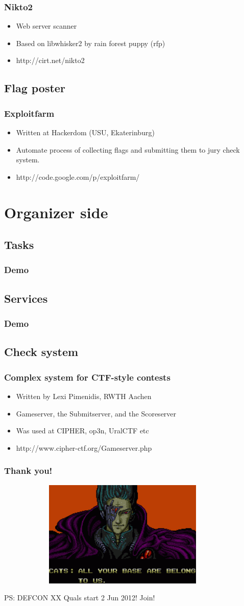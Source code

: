 \documentclass{beamer}
\begin{document}
\frame
{
\frametitle{Nikto2}
\begin{itemize}
\item Web server scanner
\item Based on libwhisker2 by rain forest puppy (rfp)
\item http://cirt.net/nikto2
\end{itemize}
}

\subsection{Flag poster}
\frame
{
\frametitle{Exploitfarm}
\begin{itemize}
\item Written at Hackerdom (USU, Ekaterinburg)
\item Automate process of collecting flags and submitting them to jury check system.
\item http://code.google.com/p/exploitfarm/
\end{itemize}
}

\section{Organizer side}
\subsection{Tasks}
\frame
{
\frametitle{Demo}
}

\subsection{Services}
\frame
{
\frametitle{Demo}
}

\subsection{Check system}
\frame
{
\frametitle{Complex system for CTF-style contests}
\begin{itemize}
\item<1-> Written by Lexi Pimenidis, RWTH Aachen
\item<1-> Gameserver, the Submitserver, and the Scoreserver
\item<1-> Was used at CIPHER, op3n, UralCTF	etc
\item<2-> http://www.cipher-ctf.org/Gameserver.php
\end{itemize}
}

\frame
{
\frametitle{Thank you!}
\begin{figure}
\includegraphics[width=4in,height=2in]{pics/aybabtu.png}
\end{figure}

PS: DEFCON XX Quals start 2 Jun 2012! Join!
}
\end{document}
